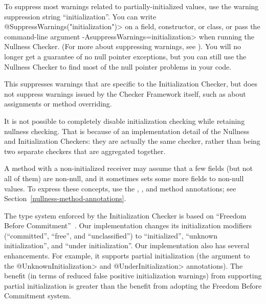 
To suppress most warnings related to partially-initialized values, use the
warning suppression string ``initialization''.
You can write \<@SuppressWarnings("initialization")>
on a field, constructor, or
class, or pass the command-line argument
\<-AsuppressWarnings=initialization> when
running the Nullness Checker.
(For more about suppressing warnings, see
).  You will no longer get a guarantee
of no null pointer exceptions, but you can still use the Nullness Checker
to find most of the null pointer problems in your code.

This suppresses warnings that are specific to the Initialization Checker,
but does not suppress warnings issued by the Checker Framework itself, such
as about assignments or method overriding.

It is not possible to completely disable initialization checking while
retaining nullness checking.  That is because
of an implementation detail of the Nullness and Initialization Checkers:
they are actually the same checker, rather than being two separate checkers
that are aggregated together.





A method with a non-initialized receiver may assume that a few fields (but not all
of them) are non-null, and it sometimes sets some more fields to non-null
values.  To express these concepts, use the
,
, and
 method annotations;
see Section~\ref{nullness-method-annotations}.



The type system enforced by the Initialization Checker is based on
``Freedom Before Commitment''~\cite{SummersM2011}.  Our implementation
changes its initialization modifiers (``committed'', ``free'', and
``unclassified'') to ``initialized'', ``unknown initialization'', and
``under initialization''.  Our implementation also has several
enhancements.  For example, it supports partial initialization (the
argument to the \<@UnknownInitialization> and \<@UnderInitialization>
annotations).  The benefit (in terms of reduced false positive
initialization warnings) from supporting partial initialization is
greater than the benefit from adopting the Freedom Before Commitment system.



